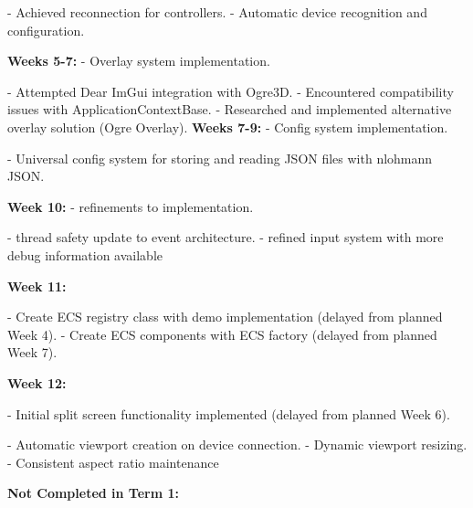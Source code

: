 \documentclass[]{final_report}
\begin{document}
 - Achieved reconnection for controllers. \newline
 - Automatic device recognition and configuration. \newline

\textbf{Weeks 5-7:} \newline
 - Overlay system implementation. \newline

 - Attempted Dear ImGui integration with Ogre3D. \newline
 - Encountered compatibility issues with ApplicationContextBase. \newline
 - Researched and implemented alternative overlay solution (Ogre Overlay). \newline
\textbf{Weeks 7-9:}
 - Config system implementation. \newline

 - Universal config system for storing and reading JSON files with nlohmann JSON. \newline

\textbf{Week 10:} \newline
 - refinements to implementation. \newline

 - thread safety update to event architecture. \newline
 - refined input system with more debug information available \newline

\textbf{Week 11:} \newline

 - Create ECS registry class with demo implementation (delayed from planned Week 4). \newline
 - Create ECS components with ECS factory (delayed from planned Week 7). \newline

\textbf{Week 12:} \newline

 - Initial split screen functionality implemented (delayed from planned Week 6). \newline

 - Automatic viewport creation on device connection. \newline
 - Dynamic viewport resizing. \newline
 - Consistent aspect ratio maintenance \newline



\textbf{Not Completed in Term 1:} \newline
\end{document}
